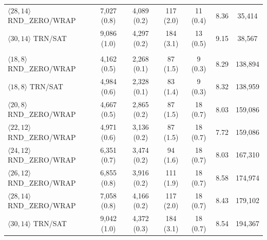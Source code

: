 \begin{table}[htbp]
\begin{tabular}{lcccccc}
$\langle 28,14\rangle$ RND\_ZERO/WRAP & 7,027 (0.8) & 4,089 (0.2) & 117 (2.0) & 11 (0.4) & 8.36 & 35,414 \\
$\langle 30,14\rangle$ TRN/SAT & 9,086 (1.0) & 4,297 (0.2) & 184 (3.1) & 13 (0.5) & 9.15 & 38,567 \\
\addlinespace
\multicolumn{7}{l}{\textbf{32 $\times$ 32}} \\
$\langle 18,8\rangle$ RND\_ZERO/WRAP & 4,162 (0.5) & 2,268 (0.1) & 87 (1.5) & 9 (0.3) & 8.29 & 138,894 \\
$\langle 18,8\rangle$ TRN/SAT & 4,984 (0.6) & 2,328 (0.1) & 83 (1.4) & 9 (0.3) & 8.32 & 138,959 \\
$\langle 20,8\rangle$ RND\_ZERO/WRAP & 4,667 (0.5) & 2,865 (0.2) & 87 (1.5) & 18 (0.7) & 8.03 & 159,086 \\
$\langle 22,12\rangle$ RND\_ZERO/WRAP & 4,971 (0.6) & 3,136 (0.2) & 87 (1.5) & 18 (0.7) & 7.72 & 159,086 \\
$\langle 24,12\rangle$ RND\_ZERO/WRAP & 6,351 (0.7) & 3,474 (0.2) & 94 (1.6) & 18 (0.7) & 8.03 & 167,310 \\
$\langle 26,12\rangle$ RND\_ZERO/WRAP & 6,855 (0.8) & 3,916 (0.2) & 111 (1.9) & 18 (0.7) & 8.58 & 174,974 \\
$\langle 28,14\rangle$ RND\_ZERO/WRAP & 7,058 (0.8) & 4,166 (0.2) & 117 (2.0) & 18 (0.7) & 8.43 & 179,102 \\
$\langle 30,14\rangle$ TRN/SAT & 9,042 (1.0) & 4,372 (0.3) & 184 (3.1) & 18 (0.7) & 8.54 & 194,367 \\
\bottomrule
\end{tabular}
\vspace{4pt}
\end{table}

